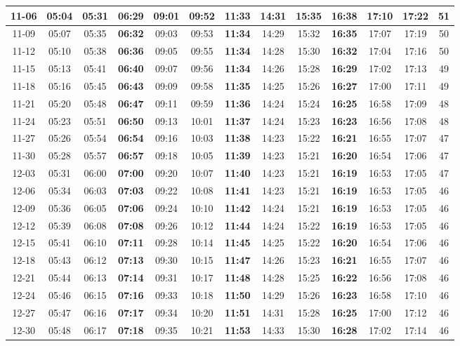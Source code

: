 \begin{footnotesize}
\begin{longtable}{c | c | c | c | c | c | c | c | c | c | c | c | c}
		11-06&05:04&05:31&\textbf{06:29}&09:01&09:52&\textbf{11:33}&14:31&15:35&\textbf{16:38}&17:10&17:22&51\\\hline
		11-09&05:07&05:35&\textbf{06:32}&09:03&09:53&\textbf{11:34}&14:29&15:32&\textbf{16:35}&17:07&17:19&50\\\hline
		11-12&05:10&05:38&\textbf{06:36}&09:05&09:55&\textbf{11:34}&14:28&15:30&\textbf{16:32}&17:04&17:16&50\\\hline
		11-15&05:13&05:41&\textbf{06:40}&09:07&09:56&\textbf{11:34}&14:26&15:28&\textbf{16:29}&17:02&17:13&49\\\hline
		11-18&05:16&05:45&\textbf{06:43}&09:09&09:58&\textbf{11:35}&14:25&15:26&\textbf{16:27}&17:00&17:11&49\\\hline
		11-21&05:20&05:48&\textbf{06:47}&09:11&09:59&\textbf{11:36}&14:24&15:24&\textbf{16:25}&16:58&17:09&48\\\hline
		11-24&05:23&05:51&\textbf{06:50}&09:13&10:01&\textbf{11:37}&14:24&15:23&\textbf{16:23}&16:56&17:08&48\\\hline
		11-27&05:26&05:54&\textbf{06:54}&09:16&10:03&\textbf{11:38}&14:23&15:22&\textbf{16:21}&16:55&17:07&47\\\hline
		11-30&05:28&05:57&\textbf{06:57}&09:18&10:05&\textbf{11:39}&14:23&15:21&\textbf{16:20}&16:54&17:06&47\\\hline
		12-03&05:31&06:00&\textbf{07:00}&09:20&10:07&\textbf{11:40}&14:23&15:21&\textbf{16:19}&16:53&17:05&47\\\hline
		12-06&05:34&06:03&\textbf{07:03}&09:22&10:08&\textbf{11:41}&14:23&15:21&\textbf{16:19}&16:53&17:05&46\\\hline
		12-09&05:36&06:05&\textbf{07:06}&09:24&10:10&\textbf{11:42}&14:24&15:21&\textbf{16:19}&16:53&17:05&46\\\hline
		12-12&05:39&06:08&\textbf{07:08}&09:26&10:12&\textbf{11:44}&14:24&15:22&\textbf{16:19}&16:53&17:05&46\\\hline
		12-15&05:41&06:10&\textbf{07:11}&09:28&10:14&\textbf{11:45}&14:25&15:22&\textbf{16:20}&16:54&17:06&46\\\hline
		12-18&05:43&06:12&\textbf{07:13}&09:30&10:15&\textbf{11:47}&14:26&15:23&\textbf{16:21}&16:55&17:07&46\\\hline
		12-21&05:44&06:13&\textbf{07:14}&09:31&10:17&\textbf{11:48}&14:28&15:25&\textbf{16:22}&16:56&17:08&46\\\hline
		12-24&05:46&06:15&\textbf{07:16}&09:33&10:18&\textbf{11:50}&14:29&15:26&\textbf{16:23}&16:58&17:10&46\\\hline
		12-27&05:47&06:16&\textbf{07:17}&09:34&10:20&\textbf{11:51}&14:31&15:28&\textbf{16:25}&17:00&17:12&46\\\hline
		12-30&05:48&06:17&\textbf{07:18}&09:35&10:21&\textbf{11:53}&14:33&15:30&\textbf{16:28}&17:02&17:14&46\\\hline
\end{longtable}\end{footnotesize}

